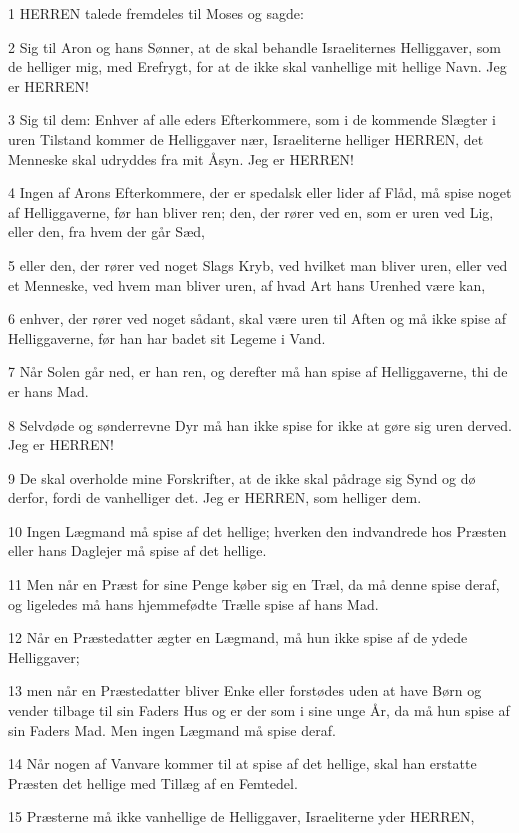 \par 1 HERREN talede fremdeles til Moses og sagde:
\par 2 Sig til Aron og hans Sønner, at de skal behandle Israeliternes Helliggaver, som de helliger mig, med Erefrygt, for at de ikke skal vanhellige mit hellige Navn. Jeg er HERREN!
\par 3 Sig til dem: Enhver af alle eders Efterkommere, som i de kommende Slægter i uren Tilstand kommer de Helliggaver nær, Israeliterne helliger HERREN, det Menneske skal udryddes fra mit Åsyn. Jeg er HERREN!
\par 4 Ingen af Arons Efterkommere, der er spedalsk eller lider af Flåd, må spise noget af Helliggaverne, før han bliver ren; den, der rører ved en, som er uren ved Lig, eller den, fra hvem der går Sæd,
\par 5 eller den, der rører ved noget Slags Kryb, ved hvilket man bliver uren, eller ved et Menneske, ved hvem man bliver uren, af hvad Art hans Urenhed være kan,
\par 6 enhver, der rører ved noget sådant, skal være uren til Aften og må ikke spise af Helliggaverne, før han har badet sit Legeme i Vand.
\par 7 Når Solen går ned, er han ren, og derefter må han spise af Helliggaverne, thi de er hans Mad.
\par 8 Selvdøde og sønderrevne Dyr må han ikke spise for ikke at gøre sig uren derved. Jeg er HERREN!
\par 9 De skal overholde mine Forskrifter, at de ikke skal pådrage sig Synd og dø derfor, fordi de vanhelliger det. Jeg er HERREN, som helliger dem.
\par 10 Ingen Lægmand må spise af det hellige; hverken den indvandrede hos Præsten eller hans Daglejer må spise af det hellige.
\par 11 Men når en Præst for sine Penge køber sig en Træl, da må denne spise deraf, og ligeledes må hans hjemmefødte Trælle spise af hans Mad.
\par 12 Når en Præstedatter ægter en Lægmand, må hun ikke spise af de ydede Helliggaver;
\par 13 men når en Præstedatter bliver Enke eller forstødes uden at have Børn og vender tilbage til sin Faders Hus og er der som i sine unge År, da må hun spise af sin Faders Mad. Men ingen Lægmand må spise deraf.
\par 14 Når nogen af Vanvare kommer til at spise af det hellige, skal han erstatte Præsten det hellige med Tillæg af en Femtedel.
\par 15 Præsterne må ikke vanhellige de Helliggaver, Israeliterne yder HERREN,
